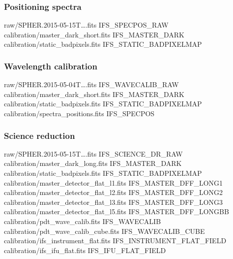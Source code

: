 \documentclass[twoside,single]{lion-msc}
\begin{document}
\subsubsection*{Positioning spectra}
\begin{mdframed}[linewidth = 0.2mm, linecolor = black]
raw/SPHER.2015-05-15T\dots.fits IFS\_SPECPOS\_RAW\\
calibration/master\_dark\_short.fits IFS\_MASTER\_DARK\\
calibration/static\_badpixels.fits IFS\_STATIC\_BADPIXELMAP
\end{mdframed}

\subsubsection*{Wavelength calibration}
\begin{mdframed}[linewidth = 0.2mm, linecolor = black]
raw/SPHER.2015-05-04T\dots.fits IFS\_WAVECALIB\_RAW\\
calibration/master\_dark\_short.fits IFS\_MASTER\_DARK\\
calibration/static\_badpixels.fits IFS\_STATIC\_BADPIXELMAP\\
calibration/spectra\_positions.fits IFS\_SPECPOS
\end{mdframed}

\subsubsection*{Science reduction}
\begin{mdframed}[linewidth = 0.2mm, linecolor = black]
raw/SPHER.2015-05-15T\dots.fits IFS\_SCIENCE\_DR\_RAW\\
calibration/master\_dark\_long.fits IFS\_MASTER\_DARK\\
calibration/static\_badpixels.fits IFS\_STATIC\_BADPIXELMAP\\
calibration/master\_detector\_flat\_l1.fits IFS\_MASTER\_DFF\_LONG1\\
calibration/master\_detector\_flat\_l2.fits IFS\_MASTER\_DFF\_LONG2\\
calibration/master\_detector\_flat\_l3.fits IFS\_MASTER\_DFF\_LONG3\\
calibration/master\_detector\_flat\_l5.fits IFS\_MASTER\_DFF\_LONGBB\\
calibration/pdt\_wave\_calib.fits IFS\_WAVECALIB\\
calibration/pdt\_wave\_calib\_cube.fits IFS\_WAVECALIB\_CUBE\\
calibration/ifs\_instrument\_flat.fits IFS\_INSTRUMENT\_FLAT\_FIELD\\
calibration/ifs\_ifu\_flat.fits IFS\_IFU\_FLAT\_FIELD
\end{mdframed}



\end{document}
